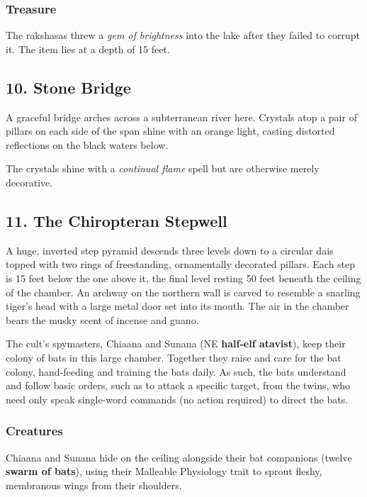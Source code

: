 \documentclass[10pt,a4paper,twoside,bg=print,twocolumn,openany,nodeprecatedcode]{dndbook}
\begin{document}
\subsubsection{Treasure}
The rakshasas threw a \textit{gem of brightness} into the lake after they failed to corrupt it. The item lies at a depth of 15 feet.

\subsection{10. Stone Bridge}
\begin{DndReadAloud}{}
A graceful bridge arches across a subterranean river here. Crystals atop a pair of pillars on each side of the span shine with an orange light, casting distorted reflections on the black waters below.

\end{DndReadAloud}

The crystals shine with a \textit{continual flame} spell but are otherwise merely decorative.

\subsection{11. The Chiropteran Stepwell}
\begin{DndReadAloud}{}
A huge, inverted step pyramid descends three levels down to a circular dais topped with two rings of freestanding, ornamentally decorated pillars. Each step is 15 feet below the one above it, the final level resting 50 feet beneath the ceiling of the chamber. An archway on the northern wall is carved to resemble a snarling tiger's head with a large metal door set into its mouth. The air in the chamber bears the musky scent of incense and guano.

\end{DndReadAloud}

The cult's spymasters, Chiaana and Sunana (NE \textbf{half-elf atavist}), keep their colony of bats in this large chamber. Together they raise and care for the bat colony, hand-feeding and training the bats daily. As such, the bats understand and follow basic orders, such as to attack a specific target, from the twins, who need only speak single-word commands (no action required) to direct the bats.

\subsubsection{Creatures}
Chiaana and Sunana hide on the ceiling alongside their bat companions (twelve \textbf{swarm of bats}), using their Malleable Physiology trait to sprout fleshy, membranous wings from their shoulders.
\end{document}
